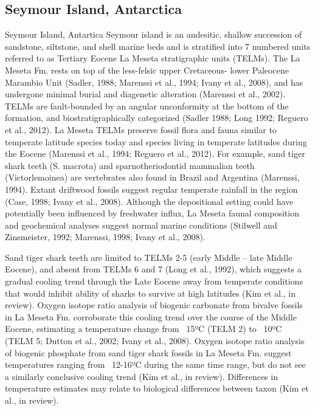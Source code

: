 \documentclass[]{rsos}%
\begin{document}
\subsection{Seymour Island, Antarctica}
Seymour Island, Antartica
Seymour island is an andesitic, shallow succession of sandstone, siltstone, and shell marine beds and is stratified into 7 numbered units referred to as Tertiary Eocene La Meseta stratigraphic units (TELMs).
The La Meseta Fm. rests on top of the less-felsic upper Cretaceous- lower Paleocene Marambio Unit (Sadler, 1988; Marenssi et al., 1994; Ivany et al., 2008), and has undergone minimal burial and diagenetic alteration (Marenssi et al., 2002).  
TELMs are fault-bounded by an angular unconformity at the bottom of the formation, and biostratigraphically categorized (Sadler 1988; Long 1992; Reguero et al., 2012). 
La Meseta TELMs preserve fossil flora and fauna similar to temperate latitude species today and species living in temperate latitudes during the Eocene (Marenssi et al., 1994; Reguero et al., 2012). 
For example, sand tiger shark teeth (S. macrota) and sparnotheriodontid mammalian teeth (Victorlemoinea) are vertebrates also found in Brazil and Argentina (Marenssi, 1994).
Extant driftwood fossils suggest regular temperate rainfall in the region (Case, 1998; Ivany et al., 2008). 
Although the depositional setting could have potentially been influenced by freshwater influx, La Meseta faunal composition and geochemical analyses suggest normal marine conditions (Stilwell and Zinsmeister, 1992; Marenssi, 1998; Ivany et al., 2008).

Sand tiger shark teeth are limited to TELMs 2-5 (early Middle – late Middle Eocene), and absent from TELMs 6 and 7 (Long et al., 1992), which suggests a gradual cooling trend through the Late Eocene away from temperate conditions that would inhibit ability of sharks to survive at high latitudes (Kim et al., in review).
Oxygen isotope ratio analysis of biogenic carbonate from bivalve fossils in La Meseta Fm. corroborate this cooling trend over the course of the Middle Eocene, estimating a temperature change from ~15ºC (TELM 2) to ~10ºC (TELM 5; Dutton et al., 2002; Ivany et al., 2008). 
Oxygen isotope ratio analysis of biogenic phosphate from sand tiger shark fossils in La Meseta Fm. suggest temperatures ranging from ~12-16ºC during the same time range, but do not see a similarly conclusive cooling trend (Kim et al., in review).
Differences in temperature estimates may relate to biological differences between taxon (Kim et al., in review).
\end{document}

